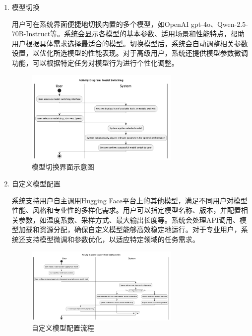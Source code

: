 \documentclass[
    report,     %
    oneside,    %
    UTF8,       %
    zihao=-4    %
]{config} %
\begin{document}
\begin{enumerate}[label=(\arabic*)]
    \item 模型切换
    
    用户可在系统界面便捷地切换内置的多个模型，如OpenAI gpt-4o、Qwen-2.5-70B-Instruct等。系统会显示各模型的基本参数、适用场景和性能特点，帮助用户根据具体需求选择最适合的模型。切换模型后，系统会自动调整相关参数设置，以优化所选模型的性能表现。对于高级用户，系统还提供模型参数微调功能，可以根据特定任务对模型行为进行个性化调整。
    \begin{figure}[H]
        \centering
        \includegraphics[width=0.7\textwidth]{UML/Activity/Model-Switching.png}
        \caption{模型切换界面示意图}
        \label{fig:ModelSwitchingInterface}
    \end{figure}
    
    \item 自定义模型配置
    
    系统支持用户自主调用Hugging Face平台上的其他模型，满足不同用户对模型性能、风格和专业性的多样化需求。用户可以指定模型名称、版本，并配置相关参数，如温度系数、采样方式、最大输出长度等。系统会处理API调用、模型加载和资源分配，确保自定义模型能够高效稳定地运行。对于专业用户，系统还支持模型微调和参数优化，以适应特定领域的任务需求。
    \begin{figure}[H]
        \centering
        \includegraphics[width=0.7\textwidth]{UML/Activity/Custom-Model-Configuration.png}
        \caption{自定义模型配置流程}
        \label{fig:CustomModelConfiguration}
    \end{figure}
    

\end{enumerate}
\end{document}
